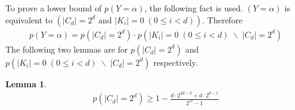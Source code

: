 \documentclass[10pt,a4paper]{article}
\newtheorem{mylemma}{Lemma}
\begin{document}
		To prove a lower bound of $p(Y = \alpha)$, the following fact is used.
		$(Y = \alpha)$ is equivalent to $\left(|C_d| = 2^d \text{ and } |K_i| = 0	\; (0 \leq i < d)\right)$.
		Therefore 
		\begin{align*}
			p(Y = \alpha) = p(|C_d| = 2^d) \cdot p(|K_i| = 0	\; (0 \leq i < d) \; \backslash \; |C_d| = 2^d)
		\end{align*}
		The following two lemmas are for $p(|C_d| = 2^d)$ and $p(|K_i| = 0	\; (0 \leq i < d) \; \backslash \; |C_d| = 2^d)$ 
		respectively.
		
		\begin{mylemma}
			\begin{align*}
				p(|C_d| = 2^d) \geq 1-\frac{d \cdot 2^{2d-2}+d \cdot 2^{d-1}}{2^D-1}
			\end{align*}
		\end{mylemma}
		
\end{document}
